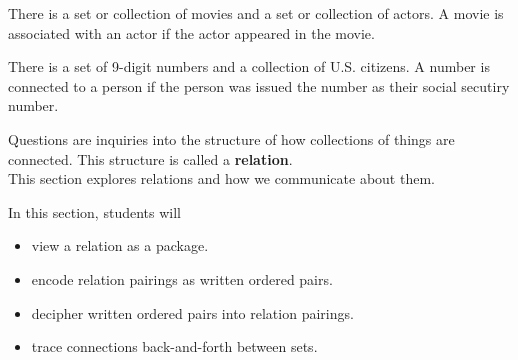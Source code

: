 \documentclass{ximera}
\begin{document}
\begin{observation}
\begin{example}
\item There is a set or collection of movies and a set or collection of actors.  A movie is associated with an actor if the actor appeared in the movie.
\end{example}

\begin{example}
\item There is a set of 9-digit numbers and a collection of U.S. citizens.  A number is connected to a person if the person was issued the number as their social secutiry number.
\end{example}


Questions are inquiries into the structure of how collections of things are connected. This structure is called a \textbf{relation}. \\This section explores relations and how we communicate about them.


\end{observation}








\begin{sectionOutcomes}
In this section, students will 

\begin{itemize}
\item view a relation as a package.
\item encode relation pairings as written ordered pairs.
\item decipher written ordered pairs into relation pairings.
\item trace connections back-and-forth between sets.
\end{itemize}
\end{sectionOutcomes}
\end{document}
